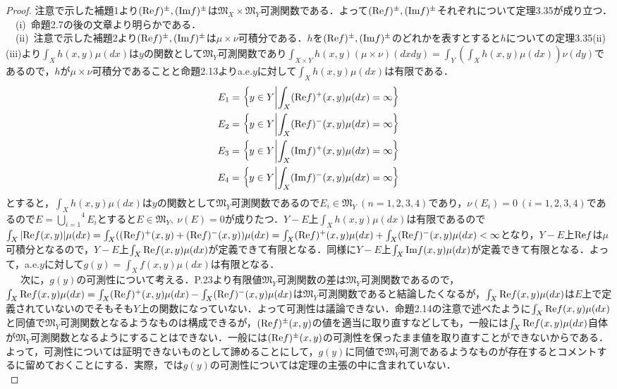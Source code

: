 \documentclass[a4paper,11pt]{jsarticle}
\newtheorem{proof}{証明}
\begin{document}
\begin{proof}
注意で示した補題1より$({\rm Re}f)^\pm,({\rm Im}f)^\pm$は$\mathfrak{M}_X\times\mathfrak{M}_Y$可測関数である．よって$({\rm Re}f)^\pm,({\rm Im}f)^\pm$それぞれについて定理3.35が成り立つ．\\
{\ }{\ }(i){\ }命題2.7の後の文章より明らかである．\\
{\ }{\ }(ii){\ }注意で示した補題2より$({\rm Re}f)^\pm,({\rm Im}f)^\pm$は$\mu\times\nu$可積分である．$h$を$({\rm Re}f)^\pm,({\rm Im}f)^\pm$のどれかを表すとすると$h$についての定理3.35(ii)(iii)より$\int_Xh(x,y)\mu(dx)$は$y$の関数として$\mathfrak{M}_Y$可測関数であり$\int_{X\times Y}h(x,y)(\mu\times\nu)(dxdy)=\int_Y\left(\int_Xh(x,y)\mu(dx)\right)\nu(dy)$であるので，$h$が$\mu\times\nu$可積分であることと命題2.13よりa.e.$y$に対して$\int_Xh(x,y)\mu(dx)$は有限である．
\begin{eqnarray*}
E_1=\left\{ y\in Y \middle| \int_X({\rm Re}f)^+(x,y)\mu(dx)=\infty \right\} \\
E_2=\left\{ y\in Y \middle| \int_X({\rm Re}f)^-(x,y)\mu(dx)=\infty \right\} \\
E_3=\left\{ y\in Y \middle| \int_X({\rm Im}f)^+(x,y)\mu(dx)=\infty \right\} \\
E_4=\left\{ y\in Y \middle| \int_X({\rm Im}f)^-(x,y)\mu(dx)=\infty \right\} \\
\end{eqnarray*}
とすると，$\int_Xh(x,y)\mu(dx)$は$y$の関数として$\mathfrak{M}_Y$可測関数であるので$E_i\in\mathfrak{M}_Y{\ }(n=1,2,3,4)$であり，$\nu(E_i)=0{\ }(i=1,2,3,4)$であるので$E=\overset{4}{\underset{i=1}{\bigcup}}E_i$とすると$E\in\mathfrak{M}_Y,{\ }\nu(E)=0$が成りたつ．$Y-E$上$\int_Xh(x,y)\mu(dx)$は有限であるので$\int_X|{\rm Re}f(x,y)|\mu(dx)=\int_X(({\rm Re}f)^+(x,y)+({\rm Re}f)^-(x,y))\mu(dx)=\int_X({\rm Re}f)^+(x,y)\mu(dx)+\int_X({\rm Re}f)^-(x,y)\mu(dx)<\infty$となり，$Y-E$上${\rm Re}f$は$\mu$可積分となるので，$Y-E$上$\int_X{\rm Re}f(x,y)\mu(dx)$が定義できて有限となる．同様に$Y-E$上$\int_X{\rm Im}f(x,y)\mu(dx)$が定義できて有限となる．よって，a.e.$y$に対して$g(y)=\int_Xf(x,y)\mu(dx)$は有限となる．\\
{\ }{\ }{\ }{\footnotesize 次に，$g(y)$の可測性について考える．P.23より有限値$\mathfrak{M}_Y$可測関数の差は$\mathfrak{M}_Y$可測関数であるので，$\int_X{\rm Re}f(x,y)\mu(dx)=\int_X({\rm Re}f)^+(x,y)\mu(dx)-\int_X({\rm Re}f)^-(x,y)\mu(dx)$は$\mathfrak{M}_Y$可測関数であると結論したくなるが，$\int_X{\rm Re}f(x,y)\mu(dx)$は$E$上で定義されていないのでそもそも$Y$上の関数になっていない．よって可測性は議論できない．命題2.14の注意で述べたように$\int_X{\rm Re}f(x,y)\mu(dx)$と同値で$\mathfrak{M}_Y$可測関数となるようなものは構成できるが，$({\rm Re}f)^\pm(x,y)$の値を適当に取り直すなどしても，一般には$\int_X{\rm Re}f(x,y)\mu(dx)$自体が$\mathfrak{M}_Y$可測関数となるようにすることはできない．一般には$({\rm Re}f)^\pm(x,y)$の可測性を保ったまま値を取り直すことができないからである．よって，可測性については証明できないものとして諦めることにして，$g(y)$に同値で$\mathfrak{M}_Y$可測であるようなものが存在するとコメントするに留めておくことにする．実際，\cite{ito}では$g(y)$の可測性については定理の主張の中に含まれていない．}\\

\end{proof}
\end{document}
